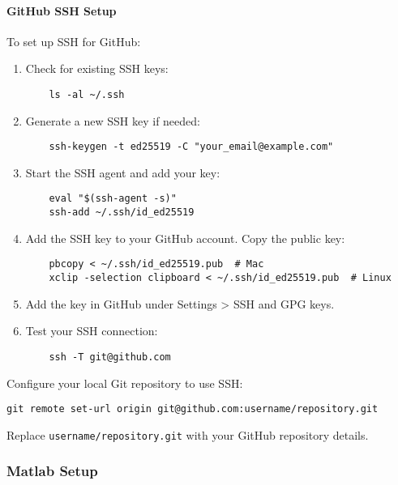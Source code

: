 \paragraph{GitHub SSH Setup}

To set up SSH for GitHub:

\begin{enumerate}
    \item Check for existing SSH keys:
    \begin{verbatim}
    ls -al ~/.ssh
    \end{verbatim}

    \item Generate a new SSH key if needed:
    \begin{verbatim}
    ssh-keygen -t ed25519 -C "your_email@example.com"
    \end{verbatim}

    \item Start the SSH agent and add your key:
    \begin{verbatim}
    eval "$(ssh-agent -s)"
    ssh-add ~/.ssh/id_ed25519
    \end{verbatim}

    \item Add the SSH key to your GitHub account. Copy the public key:
    \begin{verbatim}
    pbcopy < ~/.ssh/id_ed25519.pub  # Mac
    xclip -selection clipboard < ~/.ssh/id_ed25519.pub  # Linux
    \end{verbatim}

    \item Add the key in GitHub under Settings > SSH and GPG keys.

    \item Test your SSH connection:
    \begin{verbatim}
    ssh -T git@github.com
    \end{verbatim}
\end{enumerate}

Configure your local Git repository to use SSH:
\begin{verbatim}
git remote set-url origin git@github.com:username/repository.git
\end{verbatim}
Replace \texttt{username/repository.git} with your GitHub repository details.

\subsubsection{Matlab Setup}

